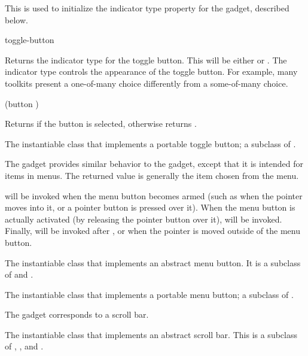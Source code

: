 
This is used to initialize the indicator type property for the gadget,
described below.

 {toggle-button}

Returns the indicator type for the toggle button.  This will be either
 or .  The indicator type controls the appearance of
the toggle button.  For example, many toolkits present a one-of-many choice
differently from a some-of-many choice.

 {(button )}

Returns  if the button is selected, otherwise returns .


The instantiable class that implements a portable toggle button; a subclass of
.



The  gadget provides similar behavior to the 
gadget, except that it is intended for items in menus.  The returned value is
generally the item chosen from the menu.

 will be invoked when the menu button becomes armed (such as
when the pointer moves into it, or a pointer button is pressed over it).  When
the menu button is actually activated (by releasing the pointer button over
it),  will be invoked.  Finally, 
will be invoked after , or when the pointer is moved
outside of the menu button.


The instantiable class that implements an abstract menu button.  It is a
subclass of  and .


The instantiable class that implements a portable menu button; a subclass of
.



The  gadget corresponds to a scroll bar.


The instantiable class that implements an abstract scroll bar.  This is a
subclass of , , and
.

